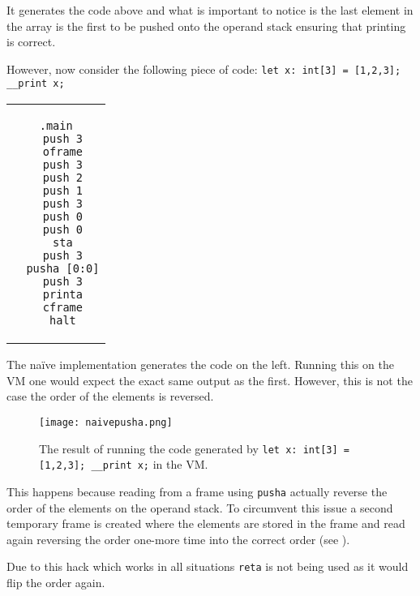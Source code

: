 It generates the code above and what is important to
notice is the last element in the array is the first to be
pushed onto the operand stack ensuring that printing is correct.

However, now consider the following piece of code: \texttt{let
x: int[3] = [1,2,3]; \_\_print x;}

\begin{center}
\begin{tabular}{c}
\begin{lstlisting}[morekeywords={sta, push, pusha, printa, oframe,
cframe, halt},frame=none]
  .main
  push 3
  oframe
  push 3
  push 2
  push 1
  push 3
  push 0
  push 0
  sta
  push 3
  pusha [0:0]
  push 3
  printa
  cframe
  halt
\end{lstlisting}
\end{tabular}
\end{center}

The naïve implementation generates the code on the left. Running
this on the VM one would expect the exact same output as the
first. However, this is not the case the order of the elements
is reversed.

\begin{figure}[H]
    \centering
    \begin{framefig}
    \texttt{[image: naivepusha.png]}
    \end{framefig}
    \caption{The result of running the code generated by
    \texttt{let x: int[3] = [1,2,3]; \_\_print x;} in the VM.}
\end{figure}

This happens because reading from a frame using \texttt{pusha}
actually reverse the order of the elements on the operand stack.
To circumvent this issue a second temporary frame is created
where the elements are stored in the frame and read again
reversing the order one-more time into the correct order (see
).

Due to this hack which works in all situations \texttt{reta} is
not being used as it would flip the order again.

